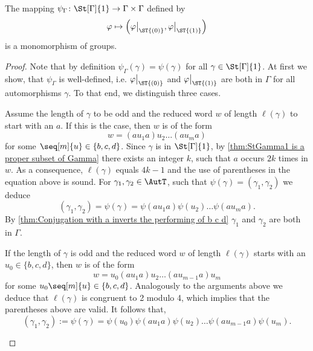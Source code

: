 \begin{lem}\label{thm:psi Gamma}
The mapping $\psi_\Gamma\colon\St[\Gamma]{1}\to\Gamma\times\Gamma$ defined by
\begin{equation*}
\varphi\mapsto\left(\varphi\big\vert_{\ST{(0)}},\varphi\big\vert_{\ST{(1)}}\right)
\end{equation*}
is a monomorphism of groups.
\end{lem}
\begin{proof}
Note that by definition $\psi_\Gamma(\gamma)=\psi(\gamma)$ for all $\gamma\in\St[\Gamma]{1}$. At first we show, that $\psi_\Gamma$ is well-defined, i.e. $\varphi\big\vert_{\ST{(0)}}$ and $\varphi\big\vert_{\ST{(1)}}$ are both in $\Gamma$ for all automorphisms $\gamma$. To that end, we distinguish three cases.
\begin{clist}
\item Assume the length of $\gamma$ to be odd and the reduced word $w$ of length $\ell(\gamma)$ to start with an $a$. If this is the case, then $w$ is of the form
\begin{equation*}
w=(au_1a)u_2\ldots (au_ma)
\end{equation*}
for some $\seq[m]{u}\in\lbrace b,c,d\rbrace$. Since $\gamma$ is in $\St[\Gamma]{1}$, by \cref{thm:StGamma1 is a proper subset of Gamma} there exists an integer $k$, such that $a$ occurs $2k$ times in $w$. As a consequence, $\ell(\gamma)$ equals $4k-1$ and the use of parentheses in the equation above is sound. For $\gamma_1,\gamma_2\in\AutT$, such that $\psi(\gamma)=(\gamma_1,\gamma_2)$ we deduce
\begin{equation*}
(\gamma_1,\gamma_2)=\psi(\gamma)=\psi(au_1a)\psi(u_2)\ldots \psi(au_ma).
\end{equation*}
By \cref{thm:Conjugation with a inverts the performing of b c d} $\gamma_1$ and $\gamma_2$ are both in $\Gamma$.
\item If the length of $\gamma$ is odd and the reduced word $w$ of length $\ell(\gamma)$ starts with an $u_0\in\lbrace b,c,d\rbrace$, then $w$ is of the form
\begin{equation*}
w=u_0(au_1a)u_2\ldots (au_{m-1}a)u_m
\end{equation*}
for some $u_0\seq[m]{u}\in\lbrace b,c,d\rbrace$. Analogously to the arguments above we deduce that $\ell(\gamma)$ is congruent to 2 modulo 4, which implies that the parentheses above are valid. It follows that,
\begin{equation*}
(\gamma_1,\gamma_2):=\psi(\gamma)=\psi(u_0)\psi(au_1a)\psi(u_2)\ldots \psi(au_{m-1}a)\psi(u_m).

\end{equation*}
\end{clist}
\end{proof}
